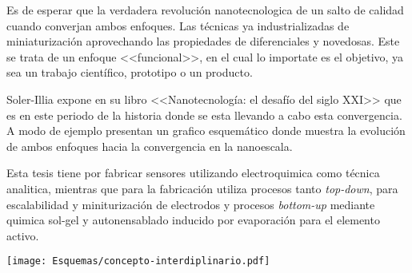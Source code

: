 	Es de esperar que la verdadera revolución nanotecnologica de un salto de calidad cuando converjan ambos enfoques. Las técnicas ya industrializadas de miniaturización aprovechando las propiedades de diferenciales y novedosas. Este se trata de un enfoque <<funcional>>, en el cual lo importate es el objetivo, ya sea un trabajo científico, prototipo o un producto.

	Soler-Illia expone en su libro <<Nanotecnología: el desafío del siglo XXI>> que es en este periodo de la historia donde se esta llevando a cabo esta convergencia. A modo de ejemplo presentan un grafico esquemático donde muestra la evolución de ambos enfoques hacia la convergencia en la nanoescala.


    Esta tesis tiene por fabricar sensores utilizando electroquimica como técnica analitica, mientras que para la fabricación utiliza procesos tanto \textit{top-down}, para escalabilidad y miniturización de electrodos y procesos \textit{bottom-up} mediante quimica sol-gel y autonensablado inducido por evaporación para el elemento activo.




 		\begin{center}
 			\texttt{[image: Esquemas/concepto-interdiplinario.pdf]}
 		    \end{center}

 







